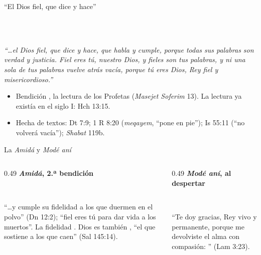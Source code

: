 \begin{frame}{``El Dios fiel, que dice y hace''}
\begin{center}\small
{}\\[1pt]
\\[1pt]
\end{center}
\scriptsize\itshape ``\ldots{}el Dios fiel, que dice y hace, que habla y cumple, porque todas sus palabras son verdad y justicia. Fiel eres tú, \SENOR{} nuestro Dios, y fieles son tus palabras, y ni una sola de tus palabras vuelve atrás vacía, porque tú eres Dios, Rey fiel y misericordioso.''\upshape\par\smallskip
\small
\begin{itemize}
\item Bendición , la lectura de los Profetas (\emph{Masejet Soferim} 13). La lectura ya existía en el siglo I: Hch 13:15.
\item Hecha de textos: Dt 7:9; 1 R 8:20 (\emph{meqayem}, ``pone en pie''); Is 55:11 (``no volverá vacía''); \emph{Shabat} 119b.
\end{itemize}
\end{frame}

\begin{frame}{La \emph{Amidá} y \emph{Modé aní}}
\begin{columns}[t,onlytextwidth]
\begin{column}{0.49\textwidth}
\textbf{\small\textcolor{azul}{\emph{Amidá}, 2.ª bendición}}\par\smallskip
\centering{}\\
\par\smallskip
\raggedright\scriptsize ``\ldots{}y cumple su fidelidad a los que duermen en el polvo'' (Dn 12:2); ``fiel eres tú para dar vida a los muertos''. La fidelidad . Dios es también , ``el que sostiene a los que caen'' (Sal 145:14).
\end{column}
\begin{column}{0.49\textwidth}
\textbf{\small\textcolor{azul}{\emph{Modé aní}, al despertar}}\par\smallskip
\centering{}\\
\par\smallskip
\raggedright\scriptsize ``Te doy gracias, Rey vivo y permanente, porque me devolviste el alma con compasión: '' (Lam 3:23).
\end{column}
\end{columns}\par\medskip
{}
\end{frame}

